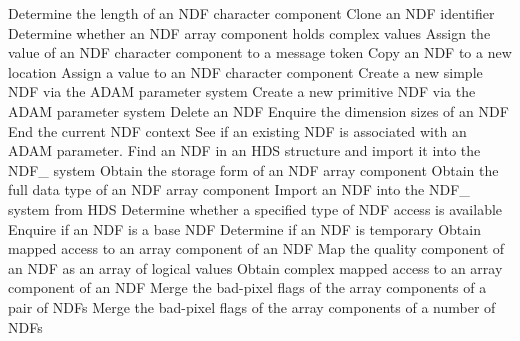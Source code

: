 \documentclass[twoside,11pt,nolof]{starlink}
\begin{document}
{\begin{description}{\addtolength{\itemindent}{-8mm}}
            {Determine the length of an NDF character component}
            {Clone an NDF identifier}
            {Determine whether an NDF array component holds complex values}
            {Assign the value of an NDF character component to a message token}
            {Copy an NDF to a new location}
            {Assign a value to an NDF character component}
            {Create a new simple NDF via the ADAM parameter system}
            {Create a new primitive NDF via the ADAM parameter system}
            {Delete an NDF}
            {Enquire the dimension sizes of an NDF}
            {End the current NDF context}
            {See if an existing NDF is associated with an ADAM parameter.}
            {Find an NDF in an HDS structure and import it into the NDF\_ system}
            {Obtain the storage form of an NDF array component}
            {Obtain the full data type of an NDF array component}
            {Import an NDF into the NDF\_ system from HDS}
            {Determine whether a specified type of NDF access is available}
            {Enquire if an NDF is a base NDF}
            {Determine if an NDF is temporary}
            {Obtain mapped access to an array component of an NDF}
            {Map the quality component of an NDF as an array of logical values}
            {Obtain complex mapped access to an array component of an NDF}
            {Merge the bad-pixel flags of the array components of a pair of NDFs}
            {Merge the bad-pixel flags of the array components of a number of NDFs}

\end{description}}
\end{document}
